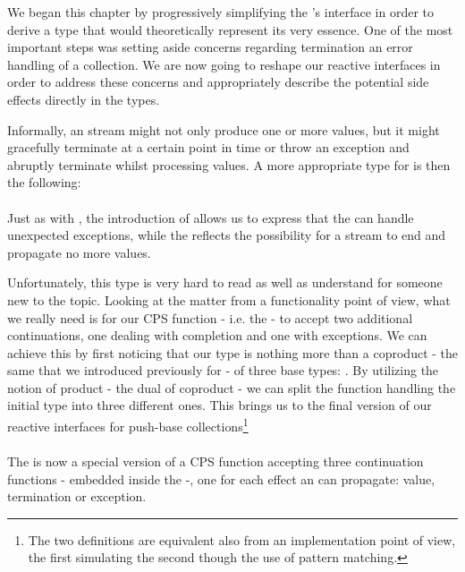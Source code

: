 We began this chapter by progressively simplifying the 's interface in order to derive a type that would theoretically represent its very essence. One of the most important steps was setting aside concerns regarding termination an error handling of a collection. We are now going to reshape our reactive interfaces in order to address these concerns and appropriately describe the potential side effects directly in the types. 

Informally, an  stream might not only produce one or more values, but it might gracefully terminate at a certain point in time or throw an exception and abruptly terminate whilst processing values. A more appropriate type for  is then the following:\\

\\

Just as with , the introduction of  allows us to express that the  can handle unexpected exceptions, while the  reflects the possibility for a stream to end and propagate no more values. 

Unfortunately, this type is very hard to read as well as understand for someone new to the topic. Looking at the matter from a functionality point of view, what we really need is for our CPS function - i.e. the  - to accept two additional continuations, one dealing with completion and one with exceptions. We can achieve this by first noticing that our type is nothing more than a coproduct - the same that we introduced previously for  - of three base types: . By utilizing the notion of product - the dual of coproduct - we can split the function handling the initial type into three different ones. This brings us to the final version of our reactive interfaces for push-base collections\footnote{The two definitions are equivalent also from an implementation point of view, the first simulating the second though the use of pattern matching.}\\

\\

The  is now a special version of a CPS function accepting three continuation functions - embedded inside the  -, one for each effect an  can propagate: value, termination or exception.

